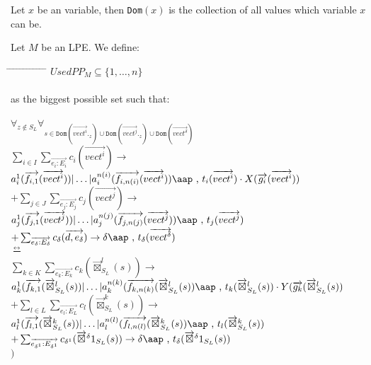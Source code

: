 \documentclass[a4paper,10pt]{article}
\theoremstyle{plain}
\theoremstyle{definition}
\newcommand{\ovr}{\overrightarrow}
\newcommand{\bisim}{\frac{\leftrightarrow}{}}
\newcommand{\tab}{\hspace*{5.mm} \= \hspace*{5.mm} \= \hspace*{5.mm} \= \hspace*{5.mm} \= \hspace*{5.mm} \= \hspace*{5.mm}  \= \hspace*{5.mm}  \= \hspace*{5.mm}  \= \hspace*{5.mm} \= \hspace*{5.mm} \= \hspace*{5.mm}  \= \hspace*{5.mm}  \= \hspace*{5.mm}\kill}
\newcommand{\at}[1]{\mbox{\aap ,} #1}
\begin{document}
\begin{defn} Let $x$ be an variable, then \texttt{Dom$(x)$} is the collection of all values which variable $x$ can be. 
\end{defn}

\newcommand{\zi}{\ovr{\boxtimes}^l_{S_L}(s)}
\newcommand{\zj}{\ovr{\boxtimes}^k_{S_L}(s)}
\newcommand{\zd}{\ovr{\boxtimes}^\delta1_{S_L}(s)}

\begin{defn} \label{def:sug3} Let $M$ be an LPE. We define:
\begin{tabbing}
\tab
\> $ UsedPP_M \subseteq \lbrace 1, \ldots, n \rbrace $ \\ \\
\> as the biggest possible set such that:\\ \\
\> $\forall_{z \not\in S_L}\forall_{s \in \texttt{Dom}(\ovr{vect^i}._z)  \cup  \texttt{Dom}(\ovr{vect^j}._z)  \cup  \texttt{Dom}(\ovr{vect^\delta})}$\\

\> \>$\sum_{i \in I} \sum_{\ovr{e_i:E_i}} c_i ( \ovr{vect^i} ) \rightarrow $
$ a_i^1 (\ovr{f_{i,1}}(\ovr{vect^i})) \vert \ldots \vert a_i^{n(i)}(\ovr{f_{i,n(i)}}(\ovr{vect^i})) \at \text{ } t_i(\ovr{vect^i})  \cdot X(\ovr{g_i}(\ovr{vect^i}))
$ \\
\> \> $+ \sum_{j \in J} \sum_{\ovr{e_j:E_j}} c_j ( \ovr{vect^j} ) \rightarrow $
$ a_j^1 (\ovr{f_{j,1}}(\ovr{vect^j})) \vert \ldots \vert a_j^{n(j)}(\ovr{f_{j,n(j)}}(\ovr{vect^j})) \at \text{ } t_j(\ovr{vect^j})
$ \\
\> \> $ + \sum_{\ovr{e_\delta:E_\delta}} c_\delta ( \ovr{d, e_\delta}) \rightarrow 
\delta \at \text{ } t_\delta(\ovr{vect^{\delta}})$ \\

\> $\bisim$ \\

\> \>$\sum_{k \in K} \sum_{\ovr{e_k:E_k}} c_k ( \zi ) \rightarrow $
$ a_k^1 (\ovr{f_{k,1}}(\zi) \vert \ldots \vert a_k^{n(k)}(\ovr{f_{k,n(k)}}(\zi) \at \text{ } t_{k}(\zi)  \cdot Y(\ovr{g_{k}}(\zi)
$ \\
\> \> $+ \sum_{l \in L} \sum_{\ovr{e_l:E_L}} c_l ( \zj ) \rightarrow $
$ a_{l}^1 (\ovr{f_{l,1}}(\zj) \vert \ldots \vert a_{l}^{n(l)}(\ovr{f_{l,n(l)}}(\zj) \at \text{ } t_{l}(\zj)
$ \\
\> \> $ + \sum_{\ovr{e_{\delta^1}:E_{\delta^1}}} c_{\delta^1} ( \zd ) \rightarrow 
{\delta} \at \text{ } t_{\delta}(\zd)$\\
$)$ \\

\end{tabbing}
\end{defn}
\end{document}
